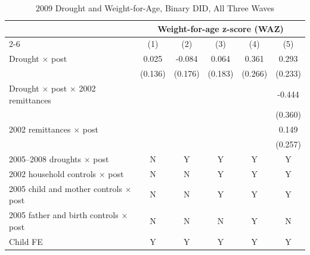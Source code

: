 \documentclass[12pt]{article}
\begin{document}
\begin{longtable}{l*{5}{c}}
\caption{2009 Drought and Weight-for-Age, Binary DID, All Three Waves}\\
\toprule
 & \multicolumn{5}{c}{Weight-for-age z-score (WAZ)}\\
\cmidrule(lr){2-6}
            &\multicolumn{1}{c}{(1)}         &\multicolumn{1}{c}{(2)}         &\multicolumn{1}{c}{(3)}         &\multicolumn{1}{c}{(4)}         &\multicolumn{1}{c}{(5)}         \\
\midrule
Drought \ensuremath{\times} post&       0.025         &      -0.084         &       0.064         &       0.361         &       0.293         \\
            &     (0.136)         &     (0.176)         &     (0.183)         &     (0.266)         &     (0.233)         \\
Drought \ensuremath{\times} post \ensuremath{\times} 2002 remittances&                     &                     &                     &                     &      -0.444         \\
            &                     &                     &                     &                     &     (0.360)         \\
2002 remittances \ensuremath{\times} post&                     &                     &                     &                     &       0.149         \\
            &                     &                     &                     &                     &     (0.257)         \\
\midrule
2005--2008 droughts \ensuremath{\times} post&           N         &           Y         &           Y         &           Y         &           Y         \\
2002 household controls \ensuremath{\times} post&           N         &           N         &           Y         &           Y         &           Y         \\
2005 child and mother controls \ensuremath{\times} post&           N         &           N         &           Y         &           Y         &           Y         \\
2005 father and birth controls \ensuremath{\times} post&           N         &           N         &           N         &           Y         &           N         \\
Child FE    &           Y         &           Y         &           Y         &           Y         &           Y         \\

\end{longtable}
\end{document}
